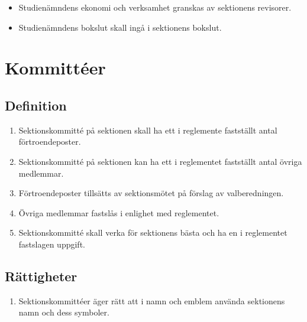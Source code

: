 \documentclass[11pt,a4paper]{article}
\begin{document}
\begin{itemize}

  \item Studienämndens ekonomi och verksamhet granskas av sektionens
  revisorer.

  \item Studienämndens bokslut skall ingå i sektionens bokslut.

\end{itemize}

\newpage



\section{Kommittéer}

\subsection{Definition}

\begin{enumerate}[\thesubsection.1]

  \item Sektionskommitté på sektionen skall ha ett i reglemente
  fastställt antal förtroendeposter.

  \item Sektionskommitté på sektionen kan ha ett i reglementet
  fastställt antal övriga medlemmar.

  \item Förtroendeposter tillsätts av sektionsmötet på förslag av
  valberedningen.

  \item Övriga medlemmar fastslås i enlighet med reglementet.

  \item Sektionskommitté skall verka för sektionens bästa och ha en i
  reglementet fastslagen uppgift.

\end{enumerate}


\subsection{Rättigheter}

\begin{enumerate}[\thesubsection.1]

  \item Sektionskommittéer äger rätt att i namn och emblem använda
  sektionens namn och dess symboler.

\end{enumerate}
\end{document}
